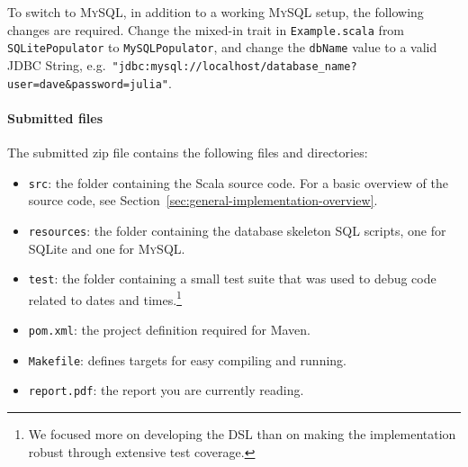\documentclass[a4paper]{article}
\newcommand{\cc}[1]{\texttt{#1}}
\renewcommand{\sc}[1]{\lstinline{#1}}
\begin{document}
To switch to \textsc{MySQL}, in addition to a working \textsc{MySQL} setup, the following changes are required.
Change the mixed-in trait in \cc{Example.scala} from \cc{SQLite\-Populator} to \cc{MySQL\-Populator}, and change the \sc{dbName} value to a valid JDBC String, e.g.\ {\color{Thistle}\cc{"jdbc:mysql://localhost/database\_name?user=dave\&password=julia"}}.


\paragraph{Submitted files}
The submitted zip file contains the following files and directories:

\begin{itemize}
\item \cc{src}: the folder containing the Scala source code.
  For a basic overview of the source code, see Section~\ref{sec:general-implementation-overview}.
\item \cc{resources}: the folder containing the database skeleton SQL scripts, one for SQLite and one for \textsc{MySQL}\@.
\item \cc{test}: the folder containing a small test suite that was used to debug code related to dates and times.\footnote{We focused more on developing the DSL than on making the implementation robust through extensive test coverage.}
\item \cc{pom.xml}: the project definition required for Maven.
\item \cc{Makefile}: defines targets for easy compiling and running.
\item \cc{report.pdf}: the report you are currently reading.
\end{itemize}
\end{document}
